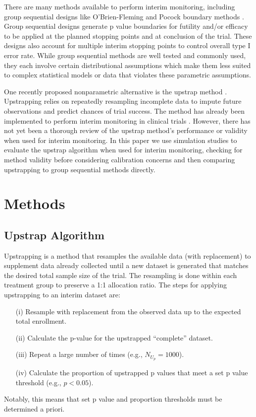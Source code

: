 \documentclass[Afour,sageh,times,square,numbers]{sagej}
\begin{document}
There are many methods available to perform interim monitoring, including group sequential designs like O’Brien-Fleming and Pocock boundary methods \cite{R5,R6}.  Group sequential designs generate p value boundaries for futility and/or efficacy to be applied at the planned stopping points and at conclusion of the trial.  These designs also account for multiple interim stopping points to control overall type I error rate.  While group sequential methods are well tested and commonly used, they each involve certain distributional assumptions which make them less suited to complex statistical models or data that violates these parametric assumptions. 

One recently proposed nonparametric alternative is the upstrap method \cite{R7}.  Upstrapping relies on repeatedly resampling incomplete data to impute future observations and predict chances of trial success.  The method has already been implemented to perform interim monitoring in clinical trials \cite{R8}.  However, there has not yet been a thorough review of the upstrap method’s performance or validity when used for interim monitoring.  In this paper we use simulation studies to evaluate the upstrap algorithm when used for interim monitoring, checking for method validity before considering calibration concerns and then comparing upstrapping to group sequential methods directly.

\section{Methods}

\subsection{Upstrap Algorithm}

Upstrapping is a method that resamples the available data (with replacement) to supplement data already collected until a new dataset is generated that matches the desired total sample size of the trial.  The resampling is done within each treatment group to preserve a 1:1 allocation ratio.  
The steps for applying upstrapping to an interim dataset are:
\begin{enumerate}
    \item[(i)] Resample with replacement from the observed data up to the expected total enrollment.
    \item[(ii)] Calculate the p-value for the upstrapped “complete” dataset.
    \item[(iii)] Repeat a large number of times (e.g., $N_{U_p}=1000$).
    \item[(iv)] Calculate the proportion of upstrapped p values that meet a set p value threshold (e.g., $p < 0.05$).
\end{enumerate}
Notably, this means that set p value and proportion thresholds must be determined a priori.
\end{document}
